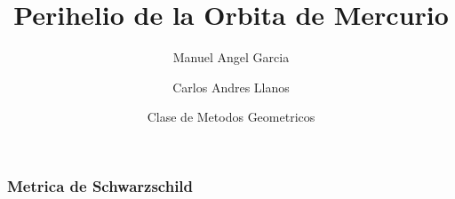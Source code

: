 \documentclass{beamer}
\title[Perihelio Mercurio] %
{Perihelio de la Orbita de Mercurio}
\author[Garcia, Raisuke] %
{Manuel Angel Garcia\inst{1} \and Carlos Andres Llanos\inst{1}}
\institute[VFU] %
{
  \inst{1}%
  Facultad de Fisica\\
  Universidad Nacional de Colombia
}
\date[2023] %
{Clase de Metodos Geometricos}
\begin{document}
\frame{\titlepage}

\begin{frame}
\frametitle{Metrica de Schwarzschild}

\end{frame}
\end{document}
